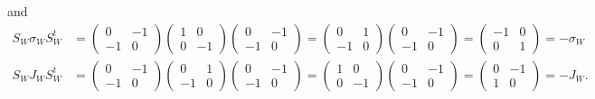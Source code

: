 \documentclass[aps,preprint]{revtex4}
\begin{document}
and%
\begin{align}
S_{W}\sigma _{W}S_{W}^{t}& =\left( 
\begin{array}{cc}
0 & -1 \\ 
-1 & 0%
\end{array}%
\right) \left( 
\begin{array}{cc}
1 & 0 \\ 
0 & -1%
\end{array}%
\right) \left( 
\begin{array}{cc}
0 & -1 \\ 
-1 & 0%
\end{array}%
\right) =\left( 
\begin{array}{cc}
0 & 1 \\ 
-1 & 0%
\end{array}%
\right) \left( 
\begin{array}{cc}
0 & -1 \\ 
-1 & 0%
\end{array}%
\right) =\left( 
\begin{array}{cc}
-1 & 0 \\ 
0 & 1%
\end{array}%
\right) =-\sigma _{W} \\
S_{W}J_{W}S_{W}^{t}& =\left( 
\begin{array}{cc}
0 & -1 \\ 
-1 & 0%
\end{array}%
\right) \left( 
\begin{array}{cc}
0 & 1 \\ 
-1 & 0%
\end{array}%
\right) \left( 
\begin{array}{cc}
0 & -1 \\ 
-1 & 0%
\end{array}%
\right) =\left( 
\begin{array}{cc}
1 & 0 \\ 
0 & -1%
\end{array}%
\right) \left( 
\begin{array}{cc}
0 & -1 \\ 
-1 & 0%
\end{array}%
\right) =\left( 
\begin{array}{cc}
0 & -1 \\ 
1 & 0%
\end{array}%
\right) =-J_{W}.
\end{align}
\end{document}
